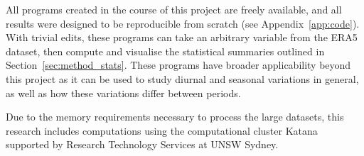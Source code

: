 All programs created in the course of this project are freely available, and all results were designed to be reproducible from scratch (see Appendix~\ref{app:code}). With trivial edits, these programs can take an arbitrary variable from the ERA5 dataset, then compute and visualise the statistical summaries outlined in Section~\ref{sec:method_stats}. These programs have broader applicability beyond this project as it can be used to study diurnal and seasonal variations in general, as well as how these variations differ between periods.

Due to the memory requirements necessary to process the large datasets, this research includes computations using the computational cluster Katana supported by Research Technology Services at \ac{UNSW} Sydney.